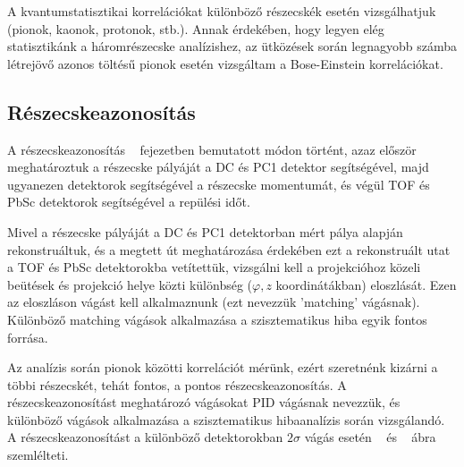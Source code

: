 \documentclass[11pt,a4paper]{article}
\numberwithin{equation}{subsection}
\numberwithin{figure}{section}
\begin{document}
A kvantumstatisztikai korrelációkat különböző részecskék esetén vizsgálhatjuk (pionok, kaonok, protonok, stb.). Annak érdekében, hogy legyen elég statisztikánk a háromrészecske analízishez, az ütközések során legnagyobb számba létrejövő azonos töltésű pionok esetén vizsgáltam a Bose-Einstein korrelációkat.

\subsection{Részecskeazonosítás}

A részecskeazonosítás ~ fejezetben bemutatott módon történt, azaz először meghatároztuk a részecske pályáját a DC és PC1 detektor segítségével, majd ugyanezen detektorok segítségével a részecske momentumát, és végül  TOF és PbSc detektorok segítségével a repülési időt.

Mivel a részecske pályáját a DC és PC1 detektorban mért pálya alapján rekonstruáltuk, és a megtett út meghatározása érdekében ezt a rekonstruált utat a TOF és PbSc detektorokba vetítettük, vizsgálni kell a projekcióhoz közeli beütések és projekció helye közti különbség ($\varphi, z$ koordinátákban) eloszlását. Ezen az eloszláson vágást kell alkalmaznunk (ezt nevezzük 'matching' vágásnak). Különböző matching vágások alkalmazása a szisztematikus hiba egyik fontos forrása.

Az analízis során pionok közötti korrelációt mérünk, ezért szeretnénk kizárni a többi részecskét, tehát fontos, a pontos részecskeazonosítás. A részecskeazonosítást meghatározó vágásokat PID vágásnak nevezzük, és különböző vágások alkalmazása a szisztematikus hibaanalízis során vizsgálandó. A részecskeazonosítást a különböző detektorokban $2\sigma$ vágás esetén ~ és ~ ábra szemlélteti.
\end{document}
